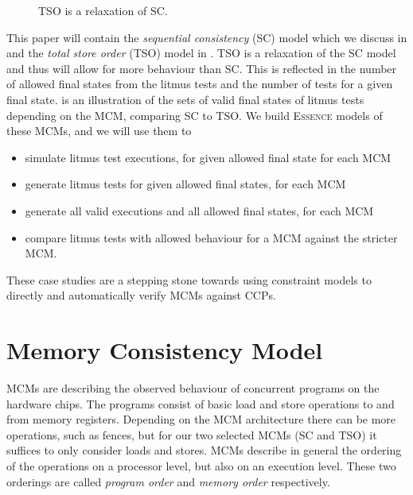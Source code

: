 \documentclass[runningheads]{llncs}
\newcommand{\essence}[0]{\textsc{Essence}}
\begin{document}
\begin{figure}
    \begin{center}
    \caption{TSO is a relaxation of SC.}
    \label{fig:venn}
    \end{center}
\end{figure}


This paper will contain the \emph{sequential consistency} (SC) model which we discuss in  and the \emph{total store order} (TSO) model in .
TSO is a relaxation of the SC model and thus will allow for more behaviour than SC.
This is reflected in the number of allowed final states from the litmus tests and the number of tests for a given final state.
 is an illustration of the sets of valid final states of litmus tests depending on the MCM, comparing SC to TSO.
We build \essence{} models of these MCMs, and we will use them to
\begin{itemize}
    \item simulate litmus test executions, for given allowed final state for each MCM
    \item generate litmus tests for given allowed final states, for each MCM
    \item generate all valid executions and all allowed final states, for each MCM
    \item compare litmus tests with allowed behaviour for a MCM against the stricter MCM.
\end{itemize}


These case studies are a stepping stone towards using constraint models to directly and automatically verify MCMs against CCPs.


\section{Memory Consistency Model}
MCMs are describing the observed behaviour of concurrent programs on the hardware chips.
The programs consist of basic load and store operations to and from memory registers.
Depending on the MCM architecture there can be more operations, such as fences, but for our two selected MCMs (SC and TSO) it suffices to only consider loads and stores.
MCMs describe in general the ordering of the operations on a processor level, but also on an execution level.
These two orderings are called \emph{program order} and \emph{memory order} respectively.
\end{document}
